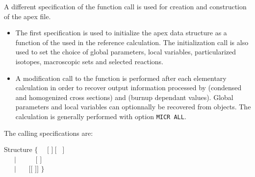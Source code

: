 \vskip 0.1cm

A different specification of the  function call is used for
creation and construction of the {\sc apex} file.
\begin{itemize}
\item The first specification is used to initialize the {\sc apex} data structure
as a function of the  used in the reference calculation. The initialization
call is also used to set the choice of global parameters, local variables, particularized
isotopes, macroscopic sets and selected reactions.
\item A modification call to the  function is performed after each
elementary calculation in order to recover output information processed by 
(condensed and homogenized cross sections) and  (burnup dependant values).
Global parameters and local variables can optionnally be recovered from 
objects. The  calculation is generally performed with option {\tt MICR ALL}.
\end{itemize}

The calling specifications are:

\vskip -0.5cm

\begin{DataStructure}{Structure }
$\{$~~ \moc{:=}  $[$  $]~[$~ $]$ \moc{::}  \\
~~~$|$~~~ \moc{:=}  ~~$[$  $]$ \moc{::}  \\
~~~$|$~~~ \moc{:=}   $[[$  $]]$ \moc{::}  $\}$ \\
\end{DataStructure}

